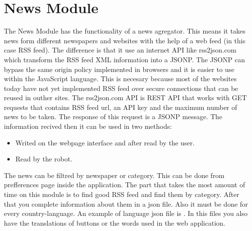 \section{News Module}
\label{sec:newsmoduel}
The News Module has the functionality of a news agregator. This means it takes news
form different newspapers and websites with the help of a web feed (in this case RSS feed).
The difference is that it use an internet API like rss2json.com which transform the RSS feed
XML information into a JSONP. The JSONP can bypass the same origin policy implemented in browsers and
it is easier to use within the JavaScript language. This is necesary because most of the websites
today have not yet implemented RSS feed over secure connections that can be reused in outher sites.
The rss2json.com API is REST API that works with GET requests that contains RSS feed url, an API key and
the maximum number of news to be taken. The response of this request is a JSONP message.
The information recived then it can be used in two methods:
\begin{itemize}
    \item Writed on the webpage interface and after read by the user.
    \item Read by the robot.
\end{itemize}
The news can be filtred by newspaper or category. This can be done from prefferences page inside the
application. The part that takes the most amount of time on this module is to find good RSS feed and
find them by category. After that you complete information about them in a json file. Also it must be done
for every country-language. An example of language json file is .
In this files you also have the translations of buttons or the words used in the web application.

